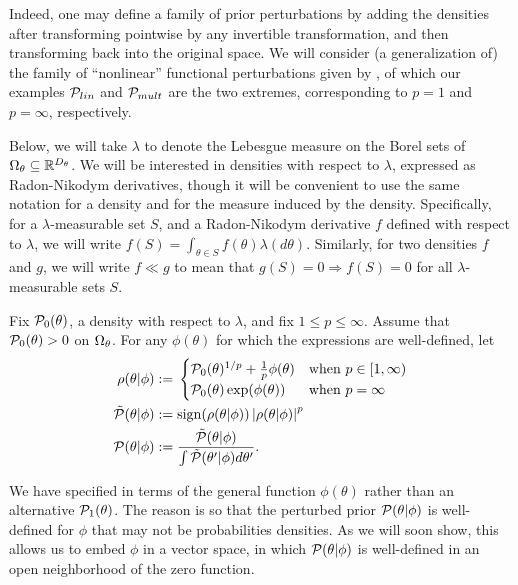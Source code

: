 Indeed, one may define a family of prior perturbations by adding the densities
after transforming pointwise by any invertible transformation, and then
transforming back into the original space.  We will consider (a generalization
of) the family of ``nonlinear'' functional perturbations given by
\citep{gustafson:1996:local}, of which our examples $\mathcal{P}_{lin}$ and $\mathcal{P}_{mult}$
are the two extremes, corresponding to $p=1$ and $p=\infty$, respectively.

Below, we will take $\lambda$ to denote the Lebesgue measure on the Borel sets
of $\Omega_{\theta} \subseteq \mathbb{R}^{{D_{\theta}}}$.  We will be interested in
densities with respect to $\lambda$, expressed as Radon-Nikodym derivatives,
though it will be convenient to use the same notation for a density and for the
measure induced by the density.  Specifically, for a $\lambda$-measurable set
$S$, and a Radon-Nikodym derivative $f$ defined with respect to $\lambda$, we
will write $f(S) = \int_{\theta \in S} f(\theta) \lambda(d\theta)$.  Similarly,
for two densities $f$ and $g$, we will write $f \ll g$ to mean that $g(S) = 0
\Rightarrow f(S) = 0$ for all $\lambda$-measurable sets $S$.

\begin{defn}
%
Fix $\mathcal{P}_{0}(\theta)$, a density with respect to $\lambda$, and fix $1 \le p \le
\infty$.  Assume that $\mathcal{P}_{0}(\theta) > 0$ on $\Omega_{\theta}$. For any
$\phi(\theta)$ for which the expressions are well-defined, let
%
\begin{align*}
%
\rho(\theta \vert \phi) :={}& \begin{cases}
%
\pbase(\theta)^{1/p} + \frac{1}{p}\phi(\theta)
    & \textrm{when }p \in [1, \infty) \\
\pbase(\theta)\exp(\phi(\theta))
    & \textrm{when }p = \infty
%
\end{cases}\\
%
\tilde{\p}(\theta \vert \phi) :={}&
    \mathrm{sign}(\rho(\theta \vert \phi)) \abs{\rho(\theta \vert \phi)}^p\\
\p(\theta \vert \phi) :={}&
    \frac{\tilde{\p}(\theta \vert \phi)}
         {\int \tilde{\p}(\theta' \vert \phi) d\theta'}.
%
\end{align*}
%
\end{defn}
%

We have specified  in terms of the general function
$\phi(\theta)$ rather than an alternative $\mathcal{P}_{1}(\theta)$.  The reason is so
that the perturbed prior $\mathcal{P}(\theta \vert \phi)$ is well-defined for $\phi$ that
may not be probabilities densities.  As we will soon show, this allows us to
embed $\phi$ in a vector space, in which $\mathcal{P}(\theta \vert \phi)$ is well-defined
in an open neighborhood of the zero function.

